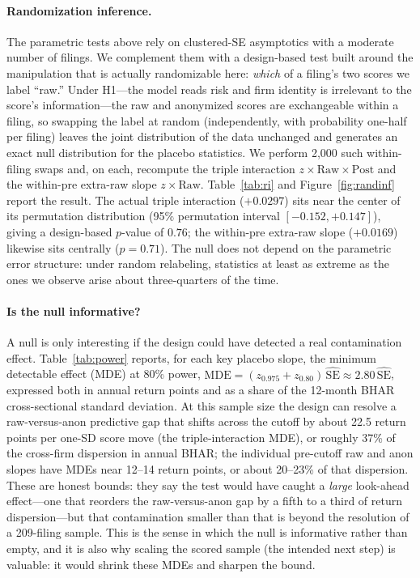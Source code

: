 \documentclass[12pt]{article}
\begin{document}
\paragraph{Randomization inference.} The parametric tests above rely on clustered-SE
asymptotics with a moderate number of filings. We complement them with a design-based test
built around the manipulation that is actually randomizable here: \emph{which} of a filing's
two scores we label ``raw.'' Under H1---the model reads risk and firm identity is irrelevant
to the score's information---the raw and anonymized scores are exchangeable within a filing,
so swapping the label at random (independently, with probability one-half per filing) leaves
the joint distribution of the data unchanged and generates an exact null distribution for the
placebo statistics. We perform 2{,}000 such within-filing swaps and, on each, recompute the
triple interaction $z\times\text{Raw}\times\text{Post}$ and the within-pre extra-raw slope
$z\times\text{Raw}$. Table~\ref{tab:ri} and Figure~\ref{fig:randinf} report the result. The
actual triple interaction ($+0.0297$) sits near the center of its permutation distribution
(95\% permutation interval $[-0.152,+0.147]$), giving a design-based $p$-value of $0.76$; the
within-pre extra-raw slope ($+0.0169$) likewise sits centrally ($p=0.71$). The null does not
depend on the parametric error structure: under random relabeling, statistics at least as
extreme as the ones we observe arise about three-quarters of the time.

\paragraph{Is the null informative?} A null is only interesting if the design could have
detected a real contamination effect. Table~\ref{tab:power} reports, for each key placebo
slope, the minimum detectable effect (MDE) at 80\% power,
$\text{MDE}=(z_{0.975}+z_{0.80})\,\widehat{\text{SE}}\approx 2.80\,\widehat{\text{SE}}$,
expressed both in annual return points and as a share of the 12-month BHAR cross-sectional
standard deviation. At this sample size the design can resolve a raw-versus-anon predictive
gap that shifts across the cutoff by about 22.5 return points per one-SD score move (the
triple-interaction MDE), or roughly 37\% of the cross-firm dispersion in annual BHAR; the
individual pre-cutoff raw and anon slopes have MDEs near 12--14 return points, or about
20--23\% of that dispersion. These are honest bounds: they say the test would have caught a
\emph{large} look-ahead effect---one that reorders the raw-versus-anon gap by a fifth to a
third of return dispersion---but that contamination smaller than that is beyond the resolution
of a 209-filing sample. This is the sense in which the null is informative rather than empty,
and it is also why scaling the scored sample (the intended next step) is valuable: it would
shrink these MDEs and sharpen the bound.
\end{document}
